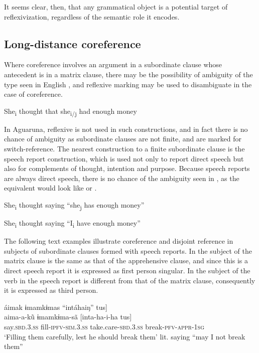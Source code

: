 \documentclass[output=paper]{langscibook}
\begin{document}
It seems clear, then, that any grammatical object is a potential target of reflexivization, regardless of the semantic role it encodes.

\subsection{Long-distance coreference} %
\label{sec:overall:4.4}

Where coreference involves an argument in a subordinate clause whose antecedent is in a matrix clause, there may be the possibility of ambiguity of the type seen in English , and reflexive marking may be used to disambiguate in the case of coreference.

\ea%
    \label{ex:overall:33}
    She\textsubscript{i} thought that she\textsubscript{i/j} had enough money
\z

In Aguaruna, reflexive is not used in such constructions, and in fact there is no chance of ambiguity as subordinate clauses are not finite, and are marked for switch-reference. The nearest construction to a finite subordinate clause is the speech report construction, which is used not only to report direct speech but also for complements of thought, intention and purpose. Because speech reports are always direct speech, there is no chance of the ambiguity seen in , as the equivalent would look like  or .

\ea%
    \label{ex:overall:34}
    She\textsubscript{i} thought saying “she\textsubscript{j} has enough money”
    \z

\ea%
    \label{ex:overall:35}
    She\textsubscript{i} thought saying “I\textsubscript{i} have enough money”
    \z

The following text examples illustrate coreference and disjoint reference in subjects of subordinate clauses formed with speech reports. In  the subject of the matrix clause is the same as that of the apprehensive clause, and since this is a direct speech report it is expressed as first person singular. In  the subject of the verb in the speech report is different from that of the matrix clause, consequently it is expressed as third person.

\ea%
    \label{ex:overall:36}
    \glll áimak ɨmamkɨmas “intáhaiŋ” tus]\\
  aima-a-k\~u  ɨmamkɨma-sã [inta-ha-i-ha  tus]\\ say.\textsc{sbd.3.ss}
  fill-\textsc{ipfv-sim.3.ss}  take.care-\textsc{sbd.3.ss}  break-\textsc{pfv-appr-1sg}\\
 \glt  ‘Filling them carefully, lest he should break them’ lit. saying “may I not break them” \citep[363]{Overall2017}
 \z
\end{document}
